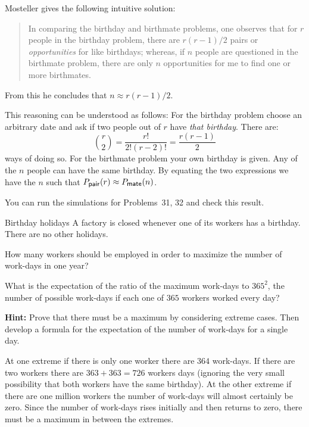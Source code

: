 
Mosteller \cite[p.~322]{birthday} gives the following intuitive solution:
\begin{quote}
In comparing the birthday and birthmate problems, one observes that for $r$ people in the birthday problem, there are $r(r-1)/2$ pairs or \emph{opportunities} for like birthdays; whereas, if $n$ people are questioned in the birthmate problem, there are only $n$ opportunities for me to find one or more birthmates.
\end{quote}
From this he concludes that $n\approx r(r-1)/2$.

This reasoning can be understood as follows: For the birthday problem choose an arbitrary date and ask if two people out of $r$ have \emph{that birthday}. There are:
\[
{r \choose 2}=\frac{r!}{2!(r-2)!} = \frac{r(r-1)}{2}
\]
ways of doing so. For the birthmate problem your own birthday is given. Any of the $n$ people can have the same birthday. By equating the two expressions we have the $n$ such that $P_{\textsf{\footnotesize pair}}(r) \approx P_{\textsf{\footnotesize mate}}(n)$.

You can run the simulations for Problems~31, 32 and check this result.


\begin{prob}{Birthday holidays}
A factory is closed whenever one of its workers has a birthday. There are no other holidays.

 How many workers should be employed in order to maximize the number of work-days in one year?

 What is the expectation of the ratio of the maximum work-days to $365^2$, the number of possible work-days if each one of $365$ workers worked every day?

\textbf{Hint:} Prove that there must be a maximum by considering extreme cases. Then develop a formula for the expectation of the number of work-days for a single day.
\end{prob}

\solution{}

At one extreme if there is only one worker there are $364$ work-days. If there are two workers there are $363+363=726$ workers days (ignoring the very small possibility that both workers have the same birthday). At the other extreme if there are one million workers the number of work-days will almost certainly be zero. Since the number of work-days rises initially and then returns to zero, there must be a maximum in between the extremes.

